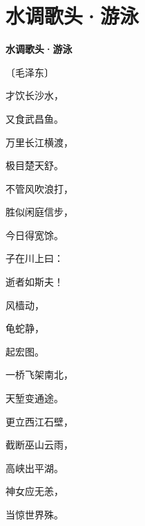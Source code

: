 \documentclass[12pt,UTF-8,openany,fontset=none]{ctexbook}
\begin{document}
\section{水调歌头·游泳}


\begin{center}
    {\bfseries 水调歌头·游泳}

    \vspace{18pt}

    \begin{large}\xuwen
        〔毛泽东〕
    \end{large}

\end{center}

    \vspace{18pt}  %

\begin{center}
    \begin{Large}

        才饮长沙水，

        又食武昌鱼。

        万里长江横渡，

        极目楚天舒。

        不管风吹浪打，

        胜似闲庭信步，

        今日得宽馀。

        子在川上曰：

        逝者如斯夫！

        \vspace{18pt}  %

        风樯动，

        龟蛇静，

        起宏图。

        一桥飞架南北，

        天堑变通途。

        更立西江石壁，

        截断巫山云雨，

        高峡出平湖。

        神女应无恙，

        当惊世界殊。

    \end{Large}

\end{center}

\vspace{8pt}
\clearpage
\end{document}

